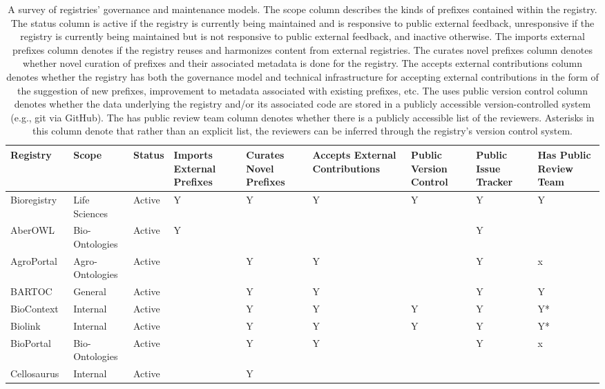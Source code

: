 \begin{table}
\caption{A survey of registries' governance and maintenance models. The scope column describes the kinds of prefixes contained within the registry. The status column is active if the registry is currently being maintained and is responsive to public external feedback, unresponsive if the registry is currently being maintained but is not responsive to public external feedback, and inactive otherwise. The imports external prefixes column denotes if the registry reuses and harmonizes content from external registries. The curates novel prefixes column denotes whether novel curation of prefixes and their associated metadata is done for the registry. The accepts external contributions column denotes whether the registry has both the governance model and technical infrastructure for accepting external contributions in the form of the suggestion of new prefixes, improvement to metadata associated with existing prefixes, etc. The uses public version control column denotes whether the data underlying the registry and/or its associated code are stored in a publicly accessible version-controlled system (e.g., git via GitHub). The has public review team column denotes whether there is a publicly accessible list of the reviewers. Asterisks in this column denote that rather than an explicit list, the reviewers can be inferred through the registry's version control system.}
\label{tab:registry-comparison-governance}
\begin{tabular}{lllllllll}
\toprule
Registry & Scope & Status & Imports External Prefixes & Curates Novel Prefixes & Accepts External Contributions & Public Version Control & Public Issue Tracker & Has Public Review Team \\
\midrule
Bioregistry~\cite{Hoyt2022} & Life Sciences & Active & Y & Y & Y & Y & Y & Y \\
AberOWL~\cite{Hoehndorf2015} & Bio-Ontologies & Active & Y &  &  &  & Y &  \\
AgroPortal~\cite{Jonquet2018} & Agro-Ontologies & Active &  & Y & Y &  & Y & x \\
BARTOC & General & Active &  & Y & Y &  & Y & Y \\
BioContext~\cite{biocontext} & Internal & Active &  & Y & Y & Y & Y & Y* \\
Biolink~\cite{Unni2022} & Internal & Active &  & Y & Y & Y & Y & Y* \\
BioPortal~\cite{Whetzel2011} & Bio-Ontologies & Active &  & Y & Y &  & Y & x \\
Cellosaurus~\cite{Bairoch2018} & Internal & Active &  & Y &  &  &  &  \\

\end{tabular}
\end{table}
